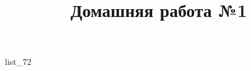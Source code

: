 \documentclass[12pt, a4paper]{article}
\begin{document}
	\title{Домашняя работа №1}
	{list_72}
\end{document}
